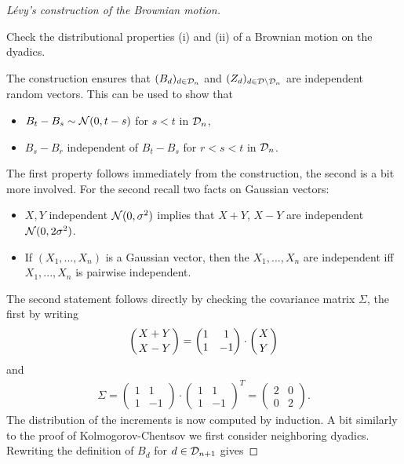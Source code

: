 \begin{proof}[L\'evy's construction of the Brownian motion]
\begin{lstep}
	Check the distributional properties (i) and (ii) of a Brownian motion on the dyadics.
\end{lstep}
The construction ensures that $(B_d)_{d\in \mathcal{D}_n}$ and $(Z_d)_{d\in \mathcal{D}\setminus \mathcal{D}_n}$ are independent random vectors. This can be used to show that 
\begin{itemize}
	\item $B_t - B_s \sim \mathcal{N}(0,t-s)$ for $s<t$ in $\mathcal{D}_n$,
	\item  $B_s - B_r$ independent of $B_t - B_s$ for $r<s<t$ in $\mathcal{D}_n$.
\end{itemize}
The first property follows immediately from the construction, the second is a bit more involved. For the second recall two facts on Gaussian vectors:
					\begin{itemize}
						\item $X,Y$ independent $\mathcal{N}(0,\sigma^2)$ implies that $X+Y$, $X-Y$ are independent $\mathcal{N}(0,2\sigma^2)$.
						\item If $(X_1,...,X_n)$ is a Gaussian vector, then the $X_1,...,X_n$ are independent iff $X_1,...,X_n$ is pairwise independent.
					\end{itemize}
					The second statement follows directly by checking the covariance matrix $\Sigma$, the first by writing 
					\begin{align*}
						\left(X+Y\atop X-Y\right)= \left(\begin{matrix}
							1 & 1 \\
							1 & -1 
							\end{matrix}\right)\cdot \left(X \atop Y\right)
					\end{align*}
					and 
					\begin{align*}
						\Sigma=
						\left(\begin{matrix}
								1 & 1 \\
								1 & -1 
								\end{matrix}\right)\cdot
						 \left(\begin{matrix}
									1 & 1 \\
									1 & -1 
							\end{matrix}\right)^T =
							\left(\begin{matrix}
								2 & 0 \\
								0 & 2 
						\end{matrix}\right).
					\end{align*}
				The distribution of the increments is now computed by induction. A bit similarly to the proof of Kolmogorov-Chentsov we first consider neighboring dyadics. Rewriting the definition of $B_d$ for $d\in \mathcal{D}_{n+1}$ gives

\end{proof}
